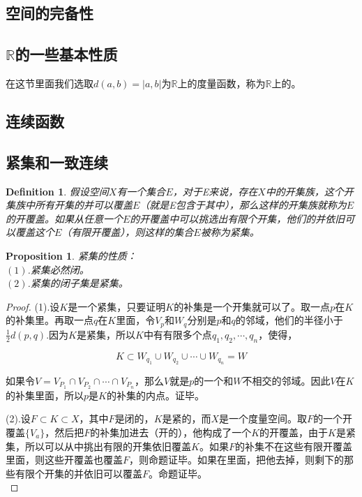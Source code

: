 \documentclass[11pt,a4paper,openany]{book}%
\theoremstyle{plain}%
\newtheorem{pro}{Proposition}[chapter]%
\newtheorem{defi}{Definition}[chapter]%
\begin{document}
\subsection{空间的完备性}
\subsection{$\mathbb{R}$的一些基本性质}
在这节里面我们选取$d(a,b)=|a,b|$为$\mathbb{R}$上的度量函数，称为$\mathbb{R}$上的。
\clearpage
\subsection{连续函数}
\subsection{紧集和一致连续}
\begin{defi}
假设空间$X$有一个集合$E$，对于E来说，存在$X$中的开集族，这个开集族中所有开集的并可以覆盖$E$（就是E包含于其中），那么这样的开集族就称为$E$的开覆盖。如果从任意一个$E$的开覆盖中可以挑选出有限个开集，他们的并依旧可以覆盖这个$E$（有限开覆盖），则这样的集合$E$被称为紧集。
\end{defi}
\begin{pro}紧集的性质：\\
$(1)$.紧集必然闭。\\
$(2)$.紧集的闭子集是紧集。
\end{pro}
\begin{proof}
(1).设$K$是一个紧集，只要证明$K$的补集是一个开集就可以了。取一点$p$在$K$的补集里。再取一点$q$在$K$里面，令$V_p$和$W_q$分别是$p$和$q$的邻域，他们的半径小于$\displaystyle{\frac{1}{2}d(p,q)}$.因为$K$是紧集，所以$K$中有有限多个点$q_1,q_2,\cdots,q_n$，使得，

\[
K \subset W_{q_1}\cup W_{q_2} \cup \cdots \cup W_{q_n}=W
\]

如果令$V=V_{P_1}\cap V_{P_2} \cap \cdots \cap V_{P_n}$，那么$V$就是$p$的一个和$W$不相交的邻域。因此$V$在$K$的补集里面，所以$p$是$K$的补集的内点。证毕。

(2).设$F\subset K\subset X$，其中$F$是闭的，$K$是紧的，而$X$是一个度量空间。取$F$的一个开覆盖$\{V_a\}$，然后把$F$的补集加进去（开的），他构成了一个$K$的开覆盖，由于$K$是紧集，所以可以从中挑出有限的开集依旧覆盖$K$。如果$F$的补集不在这些有限开覆盖里面，则这些开覆盖也覆盖$F$，则命题证毕。如果在里面，把他去掉，则剩下的那些有限个开集的并依旧可以覆盖$F$。命题证毕。\\
\end{proof}
\end{document}
